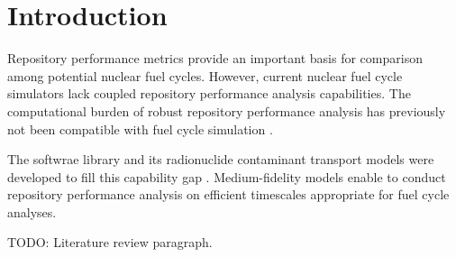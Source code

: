 \section{Introduction}\label{sec:introduction}
Repository performance metrics provide an important basis for comparison among 
potential nuclear fuel cycles. However, current nuclear fuel cycle simulators 
lack coupled repository performance analysis capabilities.  The computational 
burden of robust repository performance analysis has previously not been 
compatible with fuel cycle simulation \cite{huff_functions_2011}.

The \Cyder softwrae library and its radionuclide contaminant transport models 
were  developed to fill this capability gap \cite{huff_cyder_2013}. 
Medium-fidelity models enable \Cyder to conduct repository 
performance analysis on efficient timescales appropriate for fuel cycle 
analyses.

TODO: Literature review paragraph.
